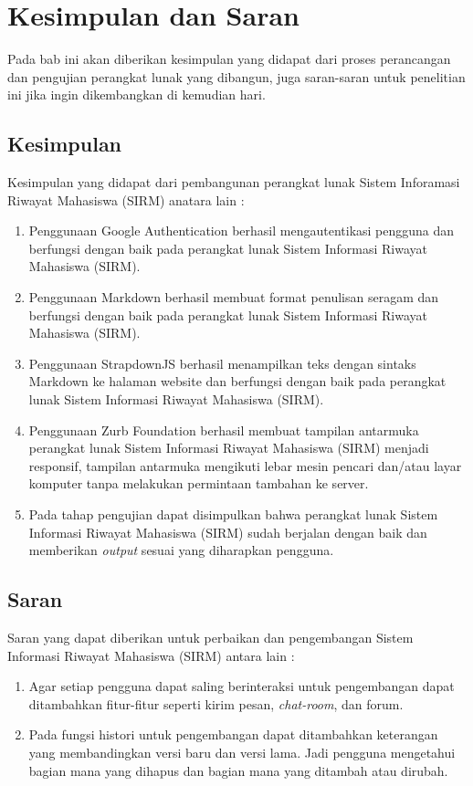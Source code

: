 \chapter{Kesimpulan dan Saran}
\label{chap:kesimpulandansaran}

Pada bab ini akan diberikan kesimpulan yang didapat dari proses perancangan dan
pengujian perangkat lunak yang dibangun, juga saran-saran untuk penelitian ini
jika ingin dikembangkan di kemudian hari.

\section{Kesimpulan}
\label{sec:kesimpulan}
Kesimpulan yang didapat dari pembangunan perangkat lunak Sistem Inforamasi
Riwayat Mahasiswa (SIRM) anatara lain :
\begin{enumerate}[(1)]
  \item Penggunaan Google Authentication berhasil mengautentikasi pengguna dan
  berfungsi dengan baik pada perangkat lunak Sistem Informasi Riwayat Mahasiswa
  (SIRM).
  \item Penggunaan Markdown berhasil membuat format penulisan seragam
  dan berfungsi dengan baik pada perangkat lunak Sistem Informasi Riwayat
  Mahasiswa (SIRM).
  \item Penggunaan StrapdownJS berhasil menampilkan teks dengan sintaks Markdown
  ke halaman website dan berfungsi dengan baik pada perangkat lunak Sistem
  Informasi Riwayat Mahasiswa (SIRM).
  \item Penggunaan Zurb Foundation berhasil membuat tampilan antarmuka perangkat
  lunak Sistem Informasi Riwayat Mahasiswa (SIRM) menjadi responsif, tampilan
  antarmuka mengikuti lebar mesin pencari dan/atau layar komputer tanpa
  melakukan permintaan tambahan ke server.
  \item Pada tahap pengujian dapat disimpulkan bahwa perangkat lunak Sistem
  Informasi Riwayat Mahasiswa (SIRM) sudah berjalan dengan baik dan memberikan
  {\it output} sesuai yang diharapkan pengguna.
\end{enumerate}

\section{Saran}
\label{sec:saran}
Saran yang dapat diberikan untuk perbaikan dan pengembangan Sistem Informasi
Riwayat Mahasiswa (SIRM) antara lain :
\begin{enumerate}[(1)]
  \item Agar setiap pengguna dapat saling berinteraksi untuk pengembangan dapat
  ditambahkan fitur-fitur seperti kirim pesan, {\it chat-room}, dan forum.
  \item Pada fungsi histori untuk pengembangan dapat ditambahkan keterangan yang
  membandingkan versi baru dan versi lama. Jadi pengguna mengetahui bagian mana
  yang dihapus dan bagian mana yang ditambah atau dirubah.
\end{enumerate}